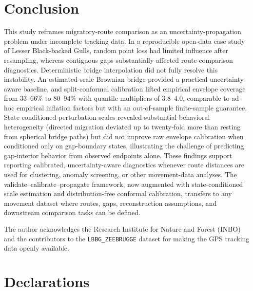 \documentclass[pdflatex,sn-vancouver-num]{sn-jnl}
\begin{document}
\section{Conclusion}\label{conclusion}

This study reframes migratory-route comparison as an uncertainty-propagation problem under incomplete tracking data. In a reproducible open-data case study of Lesser Black-backed Gulls, random point loss had limited influence after resampling, whereas contiguous gaps substantially affected route-comparison diagnostics. Deterministic bridge interpolation did not fully resolve this instability. An estimated-scale Brownian bridge provided a practical uncertainty-aware baseline, and split-conformal calibration lifted empirical envelope coverage from 33--66\% to 80--94\% with quantile multipliers of 3.8--4.0, comparable to ad-hoc empirical inflation factors but with an out-of-sample finite-sample guarantee. State-conditioned perturbation scales revealed substantial behavioral heterogeneity (directed migration deviated up to twenty-fold more than resting from spherical bridge paths) but did not improve raw envelope calibration when conditioned only on gap-boundary states, illustrating the challenge of predicting gap-interior behavior from observed endpoints alone. These findings support reporting calibrated, uncertainty-aware diagnostics whenever route distances are used for clustering, anomaly screening, or other movement-data analyses. The validate--calibrate--propagate framework, now augmented with state-conditioned scale estimation and distribution-free conformal calibration, transfers to any movement dataset where routes, gaps, reconstruction assumptions, and downstream comparison tasks can be defined.

\backmatter


The author acknowledges the Research Institute for Nature and Forest (INBO) and the contributors to the \texttt{LBBG\_ZEEBRUGGE} dataset for making the GPS tracking data openly available.

\section*{Declarations}
\end{document}
